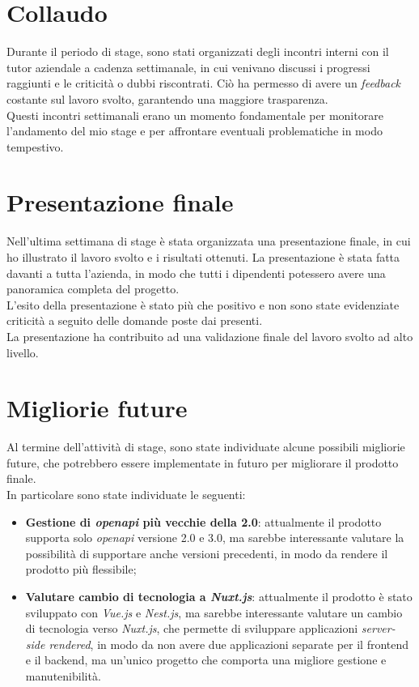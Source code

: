 \section{Collaudo}\label{sec:collaudo}
Durante il periodo di stage, sono stati organizzati degli incontri interni con il tutor aziendale a cadenza settimanale, in cui venivano discussi i progressi
raggiunti e le criticità o dubbi riscontrati. Ciò ha permesso di avere un \textit{feedback} costante sul lavoro svolto, garantendo una maggiore trasparenza.\\
Questi incontri settimanali erano un momento fondamentale per monitorare l'andamento del mio stage e per affrontare eventuali problematiche in modo tempestivo.


\section{Presentazione finale}\label{sec:presentazione-finale}
Nell'ultima settimana di stage è stata organizzata una presentazione finale, in cui ho illustrato il lavoro svolto e i risultati ottenuti.
La presentazione è stata fatta davanti a tutta l'azienda, in modo che tutti i dipendenti potessero avere una panoramica completa del progetto.\\
L'esito della presentazione è stato più che positivo e non sono state evidenziate criticità a seguito delle domande poste dai presenti.\\
La presentazione ha contribuito ad una validazione finale del lavoro svolto ad alto livello.

\section{Migliorie future}\label{sec:migliorie-future}
Al termine dell'attività di stage, sono state individuate alcune possibili migliorie future, che potrebbero essere implementate in futuro per migliorare
il prodotto finale.\\
In particolare sono state individuate le seguenti:
\begin{itemize}
  \item \textbf{Gestione di \textit{openapi} più vecchie della 2.0}: attualmente il prodotto supporta solo \textit{openapi} versione 2.0 e 3.0, ma sarebbe interessante valutare la possibilità di supportare anche versioni precedenti, in modo da rendere il prodotto più flessibile;
  \item \textbf{Valutare cambio di tecnologia a \textit{Nuxt.js}}: attualmente il prodotto è stato sviluppato con \textit{Vue.js} e \textit{Nest.js}, ma sarebbe interessante valutare un cambio di tecnologia verso \textit{Nuxt.js}, che permette di sviluppare applicazioni \textit{server-side rendered}, 
  in modo da non avere due applicazioni separate per il frontend e il backend, ma un'unico progetto che comporta una migliore gestione e manutenibilità.
\end{itemize}